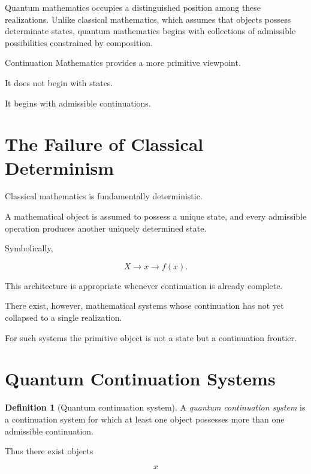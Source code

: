 \documentclass[13pt,openany]{book}
\theoremstyle{plain}
\theoremstyle{definition}
\newtheorem{definition}{Definition}[chapter]
\begin{document}
Quantum mathematics occupies a distinguished position among these
realizations. Unlike classical mathematics, which assumes that objects possess
determinate states, quantum mathematics begins with collections of admissible
possibilities constrained by composition.

Continuation Mathematics provides a more primitive viewpoint.

It does not begin with states.

It begins with admissible continuations.

\section{The Failure of Classical Determinism}

Classical mathematics is fundamentally deterministic.

A mathematical object is assumed to possess a unique state, and every
admissible operation produces another uniquely determined state.

Symbolically,

\[
X
\longrightarrow
x
\longrightarrow
f(x).
\]

This architecture is appropriate whenever continuation is already complete.

There exist, however, mathematical systems whose continuation has not yet
collapsed to a single realization.

For such systems the primitive object is not a state but a continuation
frontier.

\section{Quantum Continuation Systems}

\begin{definition}[Quantum continuation system]
A \emph{quantum continuation system} is a continuation system for which at
least one object possesses more than one admissible continuation.
\end{definition}

Thus there exist objects

\[
x
\]
\end{document}
